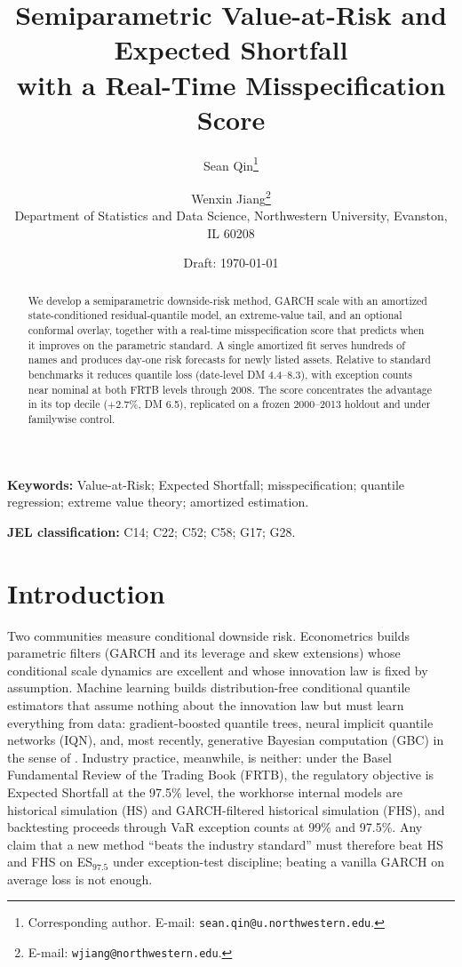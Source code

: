 \documentclass[11pt]{article}
\title{Semiparametric Value-at-Risk and Expected Shortfall\\
with a Real-Time Misspecification Score}
\author{%
  Sean Qin\thanks{Corresponding author. E-mail:
  \texttt{sean.qin@u.northwestern.edu}.}
  \and
  Wenxin Jiang\thanks{E-mail: \texttt{wjiang@northwestern.edu}.}\\[4pt]
  \normalsize Department of Statistics and Data Science, Northwestern
  University, Evanston, IL 60208}
\date{Draft: \today}
\theoremstyle{remark}
\begin{document}
\maketitle
\let\footnote\endnote

\begin{abstract}
We develop a semiparametric downside-risk method, GARCH scale with an
amortized state-conditioned residual-quantile model, an extreme-value
tail, and an optional conformal overlay, together with a real-time
misspecification score that predicts when it improves on the parametric
standard. A single amortized fit serves hundreds of names and produces
day-one risk forecasts for newly listed assets. Relative to standard
benchmarks it reduces quantile loss (date-level DM 4.4--8.3), with
exception counts near nominal at both FRTB levels through 2008. The
score concentrates the advantage in its top decile ($+2.7\%$, DM 6.5),
replicated on a frozen 2000--2013 holdout and under familywise
control.
\end{abstract}

\noindent\textbf{Keywords:} Value-at-Risk; Expected Shortfall;
misspecification; quantile regression; extreme value theory; amortized
estimation.

\medskip
\noindent\textbf{JEL classification:} C14; C22; C52; C58; G17; G28.

\section*{Introduction}\label{sec:intro}

Two communities measure conditional downside risk. Econometrics builds
parametric filters (GARCH and its leverage and skew extensions) whose
conditional scale dynamics are excellent and whose innovation law
is fixed by assumption. Machine learning builds distribution-free
conditional quantile estimators that assume nothing about the
innovation law but must learn everything from data: gradient-boosted
quantile trees, neural implicit quantile networks (IQN), and, most
recently, generative Bayesian computation (GBC) in the sense of
\citet{polson2023gbc}. Industry practice, meanwhile, is neither: under the Basel
Fundamental Review of the Trading Book (FRTB), the regulatory objective
is Expected Shortfall at the 97.5\% level, the workhorse internal models
are historical simulation (HS) and GARCH-filtered historical simulation
(FHS), and backtesting proceeds through VaR exception counts at 99\% and
97.5\%. Any claim that a new method ``beats the industry standard'' must
therefore beat HS and FHS on ES$_{97.5}$ under exception-test
discipline; beating a vanilla GARCH on average loss is not enough.
\end{document}

